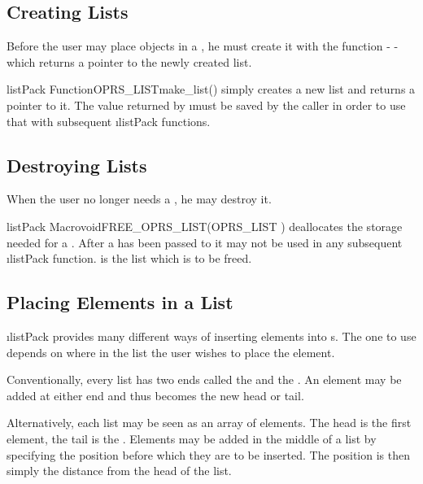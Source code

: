 \subsection{Creating Lists}

Before the user may place objects in a , he must create it with
the function -  - which returns a pointer to the newly
created
 list.

\begin{typefn}{listPack Function}{OPRS\_LIST}{make\_list}{()}
simply creates a new list and returns a pointer to it. The value returned
by
\i{must} be saved by the caller in order to use that  with
subsequent \i{listPack} functions.
\end{typefn}

\subsection{Destroying Lists}

When the user no longer needs a , he may destroy it.

\begin{typefn}{listPack Macro}{void}{FREE\_OPRS\_LIST}{(OPRS\_LIST )}
deallocates the storage needed for a . After a
 has been passed to  it may not be used in any
subsequent \i{listPack} function.  is the list which is to be
freed.
\end{typefn}

\subsection{Placing Elements in a List}

\i{listPack} provides many different ways of inserting elements into
s. The one to use depends on where in the list the user wishes
to place the element.

Conventionally, every list has two ends called the  and the
. An element may be added at either end and thus becomes
the new head or tail.

Alternatively, each list may be seen as an array of elements. The head
is the first element, the tail is the .
Elements may be added in the middle of a list by specifying the position
before which they are to be inserted. The position is then simply the
distance from the head of the list.

